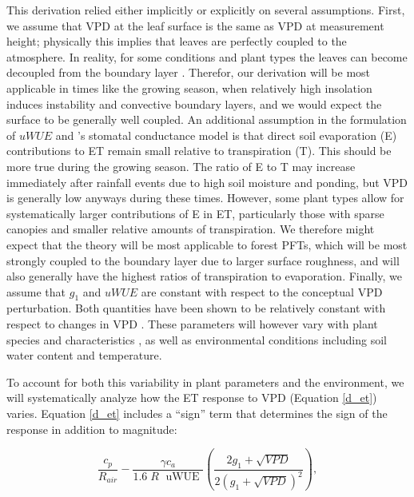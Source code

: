   This derivation relied either implicitly or explicitly on several
  assumptions. First, we assume that VPD at the leaf surface is the
  same as VPD at measurement height; physically this implies that
  leaves are perfectly coupled to the atmosphere. In reality, for some
  conditions and plant types the leaves can become decoupled from the
  boundary layer \citep{De_2017, Medlyn_2017}. Therefor, our
  derivation will be most applicable in times like the growing season,
  when relatively high insolation induces instability and convective
  boundary layers, and we would expect the surface to be generally
  well coupled. An additional assumption in the formulation of $uWUE$
  \citep{Zhou_2014, Zhou_2015} and \citet{Medlyn_2017}'s stomatal
  conductance model is that direct soil evaporation (E) contributions
  to ET remain small relative to transpiration (T). This should be
  more true during the growing season. The ratio of E to T may
  increase immediately after rainfall events due to high soil moisture
  and ponding, but VPD is generally low anyways during these
  times. However, some plant types allow for systematically larger
  contributions of E in ET, particularly those with sparse canopies
  and smaller relative amounts of transpiration. We therefore might
  expect that the theory will be most applicable to forest PFTs, which
  will be most strongly coupled to the boundary layer due to larger
  surface roughness, and will also generally have the highest ratios
  of transpiration to evaporation. Finally, we assume that $g_1$ and
  $uWUE$ are constant with respect to the conceptual VPD
  perturbation. Both quantities have been shown to be relatively
  constant with respect to changes in
  VPD \cite{Franks_2017, Zhou_2014}. These parameters will however
  vary with plant species and characteristics \citep[e.g. wood density,
  ]{Lin_2015}, as well as environmental conditions including soil
  water content and temperature.

  To account for both this variability in plant parameters and the
  environment, we will systematically analyze how the ET response to
  VPD (Equation \ref{d_et}) varies. Equation \ref{d_et} includes a
  ``sign'' term that determines the sign of the response in addition
  to magnitude:

\begin{equation}
  \label{sign}
  \frac{c_p}{R_{air}} - \frac{\gamma c_a }{1.6 \; R\; \text{ uWUE }} \left( \frac{2 g_1 + \sqrt{VPD}}{2 (g_1 + \sqrt{VPD})^2}\right),
\end{equation}

